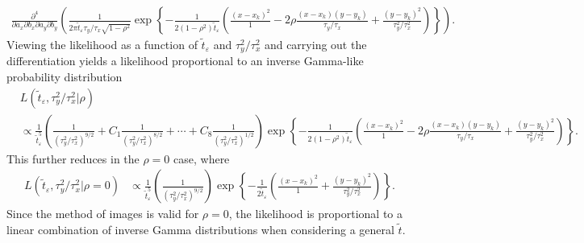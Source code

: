\documentclass[10pt]{article}
\begin{document}
\begin{enumerate}
\begin{align}
      \frac{\partial^4}{\partial a_x \partial b_x \partial a_y \partial b_y} \left( \frac{1}{2\pi \tilde{t}_\varepsilon \tau_y/\tau_x \sqrt{1-\rho^2}}  \exp\left\{ -\frac{1}{2(1-\rho^2)\tilde{t}_\varepsilon} \left( \frac{(x - x_k)^2}{1} - 2\rho \frac{(x-x_k)(y-y_k)}{\tau_y/\tau_x} +  \frac{(y - y_k)^2}{\tau_y^2/\tau_x^2}  \right)  \right\} \right).
    \end{align}
    Viewing the likelihood as a function of $\tilde{t}_\varepsilon$
    and $\tau_y^2/\tau_x^2$ and carrying out the differentiation
    yields a likelihood proportional to an inverse Gamma-like
    probability distribution
    \begin{align}
      &L(\tilde{t}_\varepsilon, \tau_y^2/\tau_x^2 | \rho) \nonumber \\
      &\propto \frac{1}{\tilde{t}_\varepsilon^5}\left(\frac{1}{(\tau_y^2/\tau_x^2)^{9/2}} + C_1 \frac{1}{(\tau_y^2/\tau_x^2)^{8/2}} + \cdots + C_8 \frac{1}{(\tau_y^2/\tau_x^2)^{1/2}} \right) \exp\left\{ -\frac{1}{2(1-\rho^2)\tilde{t}_\varepsilon} \left( \frac{(x - x_k)^2}{1} - 2\rho \frac{(x-x_k)(y-y_k)}{\tau_y/\tau_x} +  \frac{(y - y_k)^2}{\tau_y^2/\tau_x^2}  \right)  \right\} . \label{eq:inv-Gam-likelihood}
    \end{align}
    This further reduces in the $\rho = 0$ case, where
        \begin{align}
      L(\tilde{t}_\varepsilon, \tau_y^2/\tau_x^2 | \rho = 0) &\propto \frac{1}{\tilde{t}_\varepsilon^5}\left(\frac{1}{(\tau_y^2/\tau_x^2)^{9/2}}\right) \exp\left\{ -\frac{1}{2\tilde{t}_\varepsilon} \left( \frac{(x - x_k)^2}{1} +  \frac{(y - y_k)^2}{\tau_y^2/\tau_x^2}  \right)  \right\}. \label{eq:inv-Gam-likelihood-no-rho}
    \end{align}
    Since the method of images is valid for $\rho=0$, the likelihood
    is proportional to a linear combination of inverse Gamma
    distributions when considering a general $\tilde{t}$.


\end{enumerate}
\end{document}
